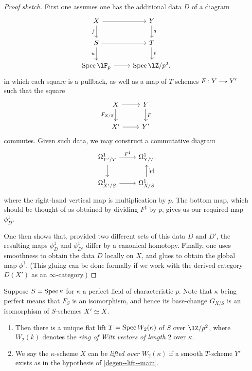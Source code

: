 \begin{proof}[Proof sketch]
  First one assumes one has the additional data $D$ of a diagram
  \[
    \begin{tikzcd}
      X \ar[r] \ar[d, "f", swap] &
      Y \ar[d, "g"] \\
      S \ar[r] \ar[d, "u", swap] &
      T \ar[d, "v"] \\
      \Spec \lF_p \ar[r] &
      \Spec \lZ/p^2.
    \end{tikzcd}
  \]
  in which each square is a pullback, as well as a map of $T$-schemes $F \c Y \to Y'$ such that the square
  \[
    \begin{tikzcd}
      X \ar[r] \ar[d, "F_{X/S}", swap] &
      Y \ar[d, "F"] \\
      X' \ar[r]  &
      Y'
    \end{tikzcd}
  \]
  commutes. Given such data, we may construct a commutative diagram
  \[
    \begin{tikzcd}
      \Omega^1_{Y'/T} \ar[r, "F^\sharp"] \ar[d] &
      \Omega^1_{Y/T}  \\
      \Omega^1_{X'/S} \ar[r]  &
      \Omega^1_{X/S} \ar[u, "{[p]}", swap]
    \end{tikzcd}
  \]
  where the right-hand vertical map is multiplication by $p$. The bottom map, which should be thought of as obtained by dividing $F^\sharp$ by $p$, gives us our required map $\phi^1_D$.

  One then shows that, provided two different sets of this data $D$ and $D'$, the resulting maps $\phi^1_D$ and $\phi^1_{D'}$ differ by a canonical homotopy. Finally, one uses smoothness to obtain the data $D$ locally on $X$, and glues to obtain the global map $\phi^1$. (This gluing can be done formally if we work with the derived category $D(X')$ as an $\infty$-category.)
\end{proof}

\begin{nothing}
  Suppose $S = \operatorname{Spec} \kappa$ for $\kappa$ a perfect field of characteristic $p$. Note that $\kappa$ being perfect means that $F_S$ is an isomorphism, and hence its base-change $G_{X/S}$ is an isomorphism of $S$-schemes $X' \simeq X$.
  \begin{enumerate}
  \item Then there is a unique flat lift $T = \operatorname{Spec} W_2(\kappa)$ of $S$ over $\lZ/p^2$, where $W_2(k)$ denotes the \emph{ring of Witt vectors of length $2$} over $\kappa$.
  \item We say the $\kappa$-scheme $X$ can be \emph{lifted over $W_2(\kappa)$} if a smooth $T$-scheme $Y'$ exists as in the hypothesis of \cref{degen--lift--main}.
  \end{enumerate}
\end{nothing}

